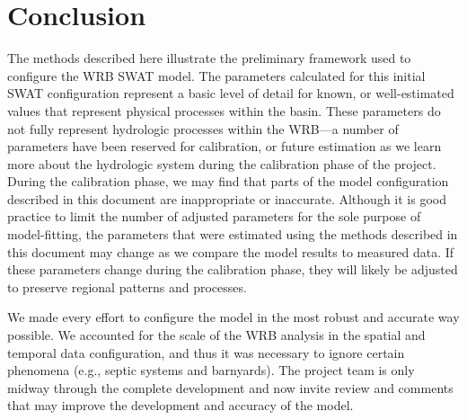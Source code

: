 \section{Conclusion}

The methods described here illustrate the preliminary framework used to configure the WRB SWAT model. 
The parameters calculated for this initial SWAT configuration represent a basic level of detail for known, or well-estimated values that represent physical processes within the basin. 
These parameters do not fully represent hydrologic processes within the WRB---a number of parameters have been reserved for calibration, or future estimation as we learn more about the hydrologic system during the calibration phase of the project. 
During the calibration phase, we may find that parts of the model configuration described in this document are inappropriate or inaccurate. 
Although it is good practice to limit the number of adjusted parameters for the sole purpose of model-fitting, the parameters that were estimated using the methods described in this document may change as we compare the model results to measured data. 
If these parameters change during the calibration phase, they will likely be adjusted to preserve regional patterns and processes.

We made every effort to configure the model in the most robust and accurate way possible. 
We accounted for the scale of the WRB analysis in the spatial and temporal data configuration, and thus it was necessary to ignore certain phenomena (e.g., septic systems and barnyards).
The project team is only midway through the complete development and now invite review and comments that may improve  the development and accuracy of the model. 



\pagebreak